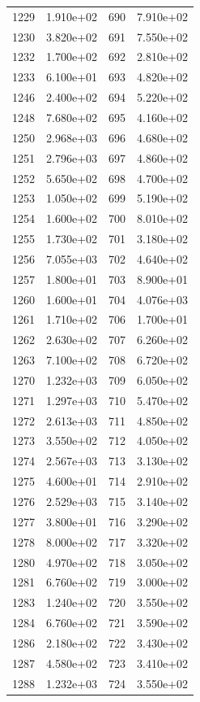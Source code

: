 \documentclass[12pt]{article}
\begin{document}
\begin{longtable}{@{}cccc@{}}
1229 & 1.910e+02 & 690 & 7.910e+02 \\
1230 & 3.820e+02 & 691 & 7.550e+02 \\
1232 & 1.700e+02 & 692 & 2.810e+02 \\
1233 & 6.100e+01 & 693 & 4.820e+02 \\
1246 & 2.400e+02 & 694 & 5.220e+02 \\
1248 & 7.680e+02 & 695 & 4.160e+02 \\
1250 & 2.968e+03 & 696 & 4.680e+02 \\
1251 & 2.796e+03 & 697 & 4.860e+02 \\
1252 & 5.650e+02 & 698 & 4.700e+02 \\
1253 & 1.050e+02 & 699 & 5.190e+02 \\
1254 & 1.600e+02 & 700 & 8.010e+02 \\
1255 & 1.730e+02 & 701 & 3.180e+02 \\
1256 & 7.055e+03 & 702 & 4.640e+02 \\
1257 & 1.800e+01 & 703 & 8.900e+01 \\
1260 & 1.600e+01 & 704 & 4.076e+03 \\
1261 & 1.710e+02 & 706 & 1.700e+01 \\
1262 & 2.630e+02 & 707 & 6.260e+02 \\
1263 & 7.100e+02 & 708 & 6.720e+02 \\
1270 & 1.232e+03 & 709 & 6.050e+02 \\
1271 & 1.297e+03 & 710 & 5.470e+02 \\
1272 & 2.613e+03 & 711 & 4.850e+02 \\
1273 & 3.550e+02 & 712 & 4.050e+02 \\
1274 & 2.567e+03 & 713 & 3.130e+02 \\
1275 & 4.600e+01 & 714 & 2.910e+02 \\
1276 & 2.529e+03 & 715 & 3.140e+02 \\
1277 & 3.800e+01 & 716 & 3.290e+02 \\
1278 & 8.000e+02 & 717 & 3.320e+02 \\
1280 & 4.970e+02 & 718 & 3.050e+02 \\
1281 & 6.760e+02 & 719 & 3.000e+02 \\
1283 & 1.240e+02 & 720 & 3.550e+02 \\
1284 & 6.760e+02 & 721 & 3.590e+02 \\
1286 & 2.180e+02 & 722 & 3.430e+02 \\
1287 & 4.580e+02 & 723 & 3.410e+02 \\
1288 & 1.232e+03 & 724 & 3.550e+02 \\

\end{longtable}
\end{document}
